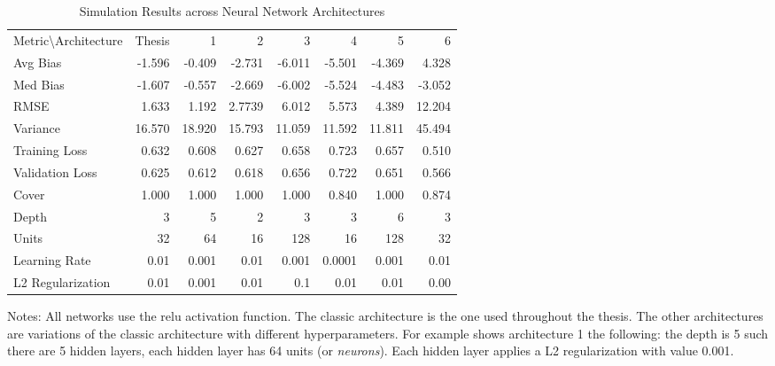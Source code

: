 \begin{table}[ht]
\centering

\begin{threeparttable}
\caption{Simulation Results across Neural Network Architectures}
\label{tab:nn}
\begin{tabular}{lrrrrrrr}
    \toprule
\hline
\addlinespace
Metric\textbackslash Architecture & Thesis &  1 &  2 &  3 &  4 &  5 & 6 \\
\addlinespace
\hline
\addlinespace
Avg Bias & -1.596 & -0.409 & -2.731 & -6.011 & -5.501 &-4.369 & 4.328\\
Med Bias & -1.607 & -0.557 & -2.669 & -6.002 & -5.524 & -4.483&-3.052 \\
RMSE & 1.633 & 1.192 & 2.7739 &  6.012 &5.573 & 4.389&12.204 \\
Variance & 16.570 & 18.920 & 15.793 & 11.059 & 11.592 & 11.811 &45.494\\
Training Loss & 0.632 & 0.608 &0.627 &0.658 & 0.723 & 0.657&0.510 \\
Validation Loss & 0.625 & 0.612 &  0.618 & 0.656 & 0.722 & 0.651&0.566 \\
Cover & 1.000 & 1.000 & 1.000 & 1.000 & 0.840 & 1.000 & 0.874\\
\addlinespace
\hline
\addlinespace
Depth & 3 & 5 & 2 & 3 & 3 & 6&3 \\
Units & 32 & 64 & 16 & 128 & 16 & 128 &32\\
Learning Rate & 0.01 & 0.001 & 0.01 & 0.001 & 0.0001 & 0.001 &0.01\\
L2 Regularization & 0.01 & 0.001 & 0.01 & 0.1 & 0.01 & 0.01 &0.00\\
\hline
\end{tabular}
\begin{tablenotes}
    \item Notes: All networks use the \ac{relu} activation function. The classic architecture is the one used throughout the thesis. The other architectures are variations of the classic architecture with different hyperparameters. For example shows architecture 1 the following: the depth is 5 such there are 5 hidden layers, each hidden layer has 64 units (or \textit{neurons}). Each hidden layer applies a L2 regularization with value 0.001.
\end{tablenotes}
\end{threeparttable}
\end{table}
